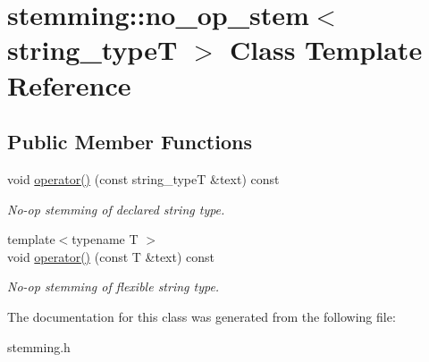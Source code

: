 \hypertarget{classstemming_1_1no__op__stem}{\section{stemming\+:\+:no\+\_\+op\+\_\+stem$<$ string\+\_\+type\+T $>$ Class Template Reference}
\label{classstemming_1_1no__op__stem}
}
\subsection*{Public Member Functions}
\begin{DoxyCompactItemize}
\item 
\hypertarget{classstemming_1_1no__op__stem_ada7ad3e0b3a7559f4c8907bf25bbd14c}{void \hyperlink{classstemming_1_1no__op__stem_ada7ad3e0b3a7559f4c8907bf25bbd14c}{operator()} (const string\+\_\+type\+T \&text) const }\label{classstemming_1_1no__op__stem_ada7ad3e0b3a7559f4c8907bf25bbd14c}

\begin{DoxyCompactList}\small\item\em No-\/op stemming of declared string type. \end{DoxyCompactList}\item 
\hypertarget{classstemming_1_1no__op__stem_a7ef5607b060c99e699455ea4c1d0038a}{{\footnotesize template$<$typename T $>$ }\\void \hyperlink{classstemming_1_1no__op__stem_a7ef5607b060c99e699455ea4c1d0038a}{operator()} (const T \&text) const }\label{classstemming_1_1no__op__stem_a7ef5607b060c99e699455ea4c1d0038a}

\begin{DoxyCompactList}\small\item\em No-\/op stemming of flexible string type. \end{DoxyCompactList}\end{DoxyCompactItemize}


The documentation for this class was generated from the following file\+:\begin{DoxyCompactItemize}
\item 
stemming.\+h\end{DoxyCompactItemize}
